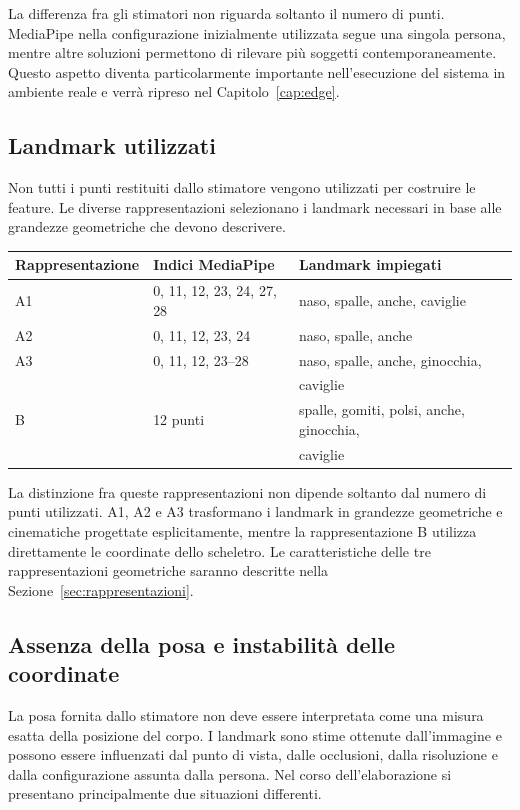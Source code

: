 La differenza fra gli stimatori non riguarda soltanto il numero di punti. MediaPipe nella configurazione inizialmente utilizzata segue una singola persona, mentre altre soluzioni permettono di rilevare più soggetti contemporaneamente. Questo aspetto diventa particolarmente importante nell'esecuzione del sistema in ambiente reale e verrà ripreso nel Capitolo~\ref{cap:edge}.

\subsection{Landmark utilizzati}

Non tutti i punti restituiti dallo stimatore vengono utilizzati per costruire le feature. Le diverse rappresentazioni selezionano i landmark necessari in base alle grandezze geometriche che devono descrivere.

\begin{center}
\begin{tabular}{lll}
\toprule
Rappresentazione & Indici MediaPipe & Landmark impiegati \\
\midrule
A1 & 0, 11, 12, 23, 24, 27, 28 & naso, spalle, anche, caviglie \\
A2 & 0, 11, 12, 23, 24 & naso, spalle, anche \\
A3 & 0, 11, 12, 23--28 & naso, spalle, anche, ginocchia, \\ && caviglie \\
B  & 12 punti & spalle, gomiti, polsi, anche, ginocchia, \\ && caviglie \\
\bottomrule
\end{tabular}
\end{center}
\vspace{0.4cm}

La distinzione fra queste rappresentazioni non dipende soltanto dal numero di punti utilizzati. A1, A2 e A3 trasformano i landmark in grandezze geometriche e cinematiche progettate esplicitamente, mentre la rappresentazione B utilizza direttamente le coordinate dello scheletro. Le caratteristiche delle tre rappresentazioni geometriche saranno descritte nella Sezione~\ref{sec:rappresentazioni}.

\subsection{Assenza della posa e instabilità delle coordinate}

La posa fornita dallo stimatore non deve essere interpretata come una misura esatta della posizione del corpo. I landmark sono stime ottenute dall'immagine e possono essere influenzati dal punto di vista, dalle occlusioni, dalla risoluzione e dalla configurazione assunta dalla persona.
Nel corso dell'elaborazione si presentano principalmente due situazioni differenti.

